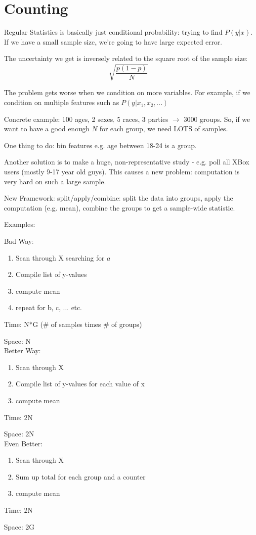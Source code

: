 
\section{Counting}


Regular Statistics is basically just conditional probability: trying to find $P(y | x)$.  If we have a small sample size, we're going to have large expected error.  

The uncertainty we get is inversely related to the square root of the sample size:
\[
\sqrt{ \dfrac{p(1-p)}{N} }
\]

The problem gets worse when we condition on more variables.  For example, if we condition on multiple features such as $P(y | x_1, x_2, ...)$

Concrete example: 100 ages, 2 sexes, 5 races, 3 parties $\rightarrow$ 3000 groups.  So, if we want to have a good enough $N$ for each group, we need LOTS of samples.

One thing to do: bin features e.g. age between 18-24 is a group.  

Another solution is to make a huge, non-representative study - e.g. poll all XBox users (mostly 9-17 year old guys).  This causes a new problem: computation is very hard on such a large sample.  

New Framework: split/apply/combine: split the data into groups, apply the computation (e.g. mean), combine the groups to get a sample-wide statistic.  

Examples: 

Bad Way: 
\begin{enumerate}
  \item Scan through X searching for $a$
  \item Compile list of y-values
  \item compute mean
  \item repeat for b, c, ... etc.
\end{enumerate}

Time: N*G (\# of samples times \# of groups)

Space: N\\

Better Way: 
\begin{enumerate}
  \item Scan through X 
  \item Compile list of y-values for each value of x
  \item compute mean
\end{enumerate}

Time: 2N

Space: 2N\\

Even Better:
\begin{enumerate}
  \item Scan through X 
  \item Sum up total for each group and a counter
  \item compute mean
\end{enumerate}


Time: 2N

Space: 2G\\
